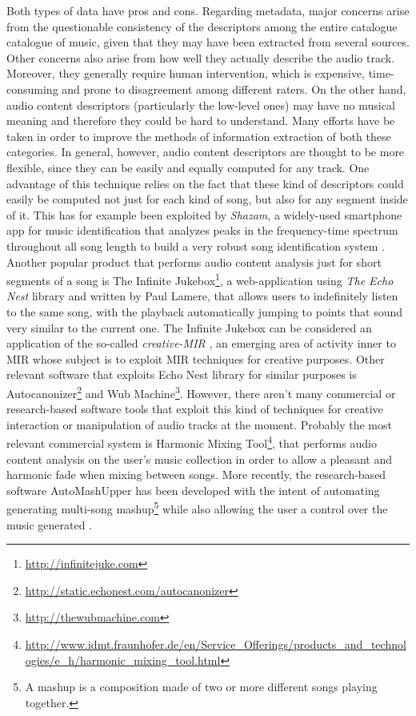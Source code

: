 Both types of data have pros and cons. Regarding metadata, major concerns arise from the questionable consistency of the descriptors among the entire catalogue catalogue of music, given that they may have been extracted from several sources. Other concerns also arise from how well they actually describe the audio track. Moreover, they generally require human intervention, which is expensive, time-consuming and prone to disagreement among different raters. On the other hand, audio content descriptors (particularly the low-level ones) may have no musical meaning and therefore they could be hard to understand. Many efforts have be taken in order to improve the methods of information extraction of both these categories. In general, however, audio content descriptors are thought to be more flexible, since they can be easily and equally computed for any track. One advantage of this technique relies on the fact that these kind of descriptors could easily be computed not just for each kind of song, but also for any segment inside of it. This has for example been exploited by \textit{Shazam}, a widely-used smartphone app for music identification that analyzes peaks in the frequency-time spectrum throughout all song length to build a very robust song identification system \cite{shazam03}. Another popular product that performs audio content analysis just for short segments of a song is The Infinite Jukebox\footnote{\url{http://infinitejuke.com}}, a web-application using \textit{The Echo Nest} library and written by Paul Lamere, that allows users to indefinitely listen to the same song, with the playback automatically jumping to points that sound very similar to the current one. The Infinite Jukebox can be considered an application of the so-called \textit{creative-MIR} \cite{xavier2013}, an emerging area of activity inner to MIR whose subject is to exploit MIR techniques for creative purposes.  Other relevant software that exploits Echo Nest library for similar purposes is Autocanonizer\footnote{\url{http://static.echonest.com/autocanonizer}} and Wub Machine\footnote{\url{http://thewubmachine.com}}. However, there aren't many commercial or research-based software tools that exploit this kind of techniques for creative interaction or manipulation of audio tracks at the moment. Probably the most relevant commercial system is Harmonic Mixing Tool\footnote{\url{http://www.idmt.fraunhofer.de/en/Service_Offerings/products_and_technologies/e_h/harmonic_mixing_tool.html}}, that performs audio content analysis on the user's music collection in order to allow a pleasant and harmonic fade when mixing between songs. More recently, the research-based software AutoMashUpper has been developed with the intent of automating generating multi-song mashup\footnote{A mashup is a composition made of two or more different songs playing together.} while also allowing the user a control over the music generated \cite{automash14}. 

